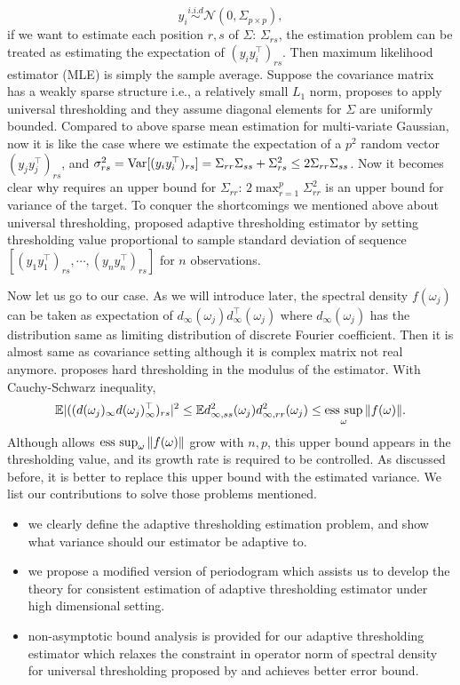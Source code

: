 \[
y_i \overset{i.i.d}{\sim} \mathcal{N}(0, \Sigma_{p\times p}),
\]
if we want to estimate each position $r, s$ of $\Sigma$: $\Sigma_{rs}$, the estimation problem can be treated as estimating the expectation of $(y_{i}y^\top_{i})_{rs}$. Then maximum likelihood estimator (MLE) is simply the sample average. Suppose the covariance matrix has a weakly sparse structure i.e., a relatively small $L_1$ norm, \cite{bickel2008covariance} proposes to apply universal thresholding 
and they assume diagonal elements for $\Sigma$ are uniformly bounded.  Compared to above sparse mean estimation for multi-variate Gaussian, now it is like the case where we estimate the expectation of a $p^2$ 
random vector $(y_jy_j^\top)_{rs}$, and $\sigma_{rs}^2 = \mathrm{Var}[(y_{i}y^\top_{i})_{rs}] = \Sigma_{rr}\Sigma_{ss} + \Sigma^2_{rs} \le 2\Sigma_{rr}\Sigma_{ss}$. Now it becomes clear why \cite{bickel2008covariance} requires an upper bound for $\Sigma_{rr}$: $2\max_{r=1}^p \Sigma^2_{rr}$ is an upper bound for variance of the target. To conquer the shortcomings we mentioned above about universal thresholding, \cite{cai2011adaptive} proposed adaptive thresholding estimator by setting thresholding value proportional to sample standard deviation of sequence $[(y_1y_1^\top)_{rs}, \cdots, (y_ny_n^\top)_{rs}]$ for $n$ observations. \par 
Now let us go to our case.  As we will introduce later, the spectral density $f(\omega_j)$ can be taken as expectation of $d_\infty (\omega_j) d^\top_\infty (\omega_j)$ where $d_\infty (\omega_j)$ has the distribution same as limiting distribution of discrete Fourier coefficient. Then it is almost same as covariance setting although it is complex matrix not real anymore. \cite{sun2018large} proposes hard thresholding in the modulus of the estimator. With Cauchy-Schwarz inequality, 
\[
\E |( (d(\omega_j)_\infty d(\omega_j)_\infty^\top)_{rs}|^2 \le \E d_{\infty, ss}^2(\omega_j) d_{\infty, rr}^2(\omega_j)\le \esssup_{\omega} \|f(\omega)\|. 
\]
Although \cite{sun2018large} allows $\esssup_{\omega} \|f(\omega)\|$ grow with $n,p$, this upper bound appears in the thresholding value, and its growth rate is required to be controlled.  As discussed before, it is better to replace this upper bound with the estimated variance.  We list our contributions to solve those problems mentioned. 

\begin{itemize}
\item we clearly define the adaptive thresholding estimation problem, and show what variance should our estimator be adaptive to.
\item we propose a modified version of periodogram which assists us to develop the theory for consistent estimation of adaptive thresholding estimator under high dimensional setting.
\item non-asymptotic bound analysis is provided for our adaptive thresholding estimator which relaxes the constraint in operator norm of spectral density for universal thresholding proposed by \cite{sun2018large} and achieves better error bound.
\end{itemize}




